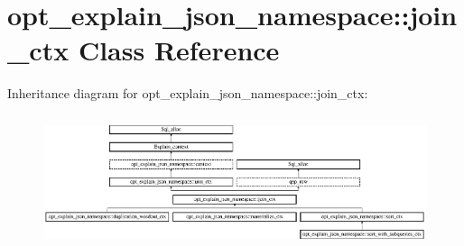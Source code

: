 \hypertarget{classopt__explain__json__namespace_1_1join__ctx}{}\section{opt\+\_\+explain\+\_\+json\+\_\+namespace\+:\+:join\+\_\+ctx Class Reference}
\label{classopt__explain__json__namespace_1_1join__ctx}
Inheritance diagram for opt\+\_\+explain\+\_\+json\+\_\+namespace\+:\+:join\+\_\+ctx\+:\begin{figure}[H]
\begin{center}
\leavevmode
\includegraphics[height=3.935743cm]{classopt__explain__json__namespace_1_1join__ctx}
\end{center}
\end{figure}
